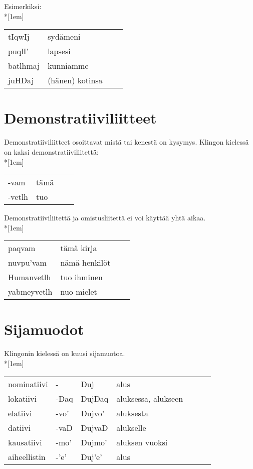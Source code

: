 \documentclass{book}
\begin{document}
Esimerkiksi:\\*[1em]
\begin{tabular}{Bl Il}
tIqwIj & sydämeni \\
puqlI' & lapsesi \\
batlhmaj & kunniamme \\
juHDaj & (hänen) kotinsa \\
\end{tabular}

\section{Demonstratiiviliitteet}

Demonstratiiviliitteet osoittavat mistä tai kenestä on kysymys.
Klingon kielessä on kaksi demonstratiiviliitettä:\\*[1em]
\begin{tabular}{Bl Il}
    -vam & tämä \\
    -vetlh & tuo \\
\end{tabular}

Demonstratiiviliitettä ja omistusliitettä ei voi käyttää yhtä aikaa.\\*[1em]
\begin{tabular}{Bl Il}
    paqvam & tämä kirja \\
    nuvpu'vam & nämä henkilöt \\
    Humanvetlh & tuo ihminen \\
    yabmeyvetlh & nuo mielet \\
\end{tabular}

\section{Sijamuodot}

Klingonin kielessä on kuusi sijamuotoa.\\*[1em]
\begin{tabular}{l Bl | Bl Il}
nominatiivi & - & Duj & alus \\
lokatiivi & -Daq & DujDaq & aluksessa, alukseen \\
elatiivi & -vo' & Dujvo' & aluksesta \\
datiivi & -vaD & DujvaD & alukselle \\
kausatiivi & -mo' & Dujmo' & aluksen vuoksi \\
aiheellistin & -'e' & Duj'e' & alus \\
\end{tabular}
\end{document}
